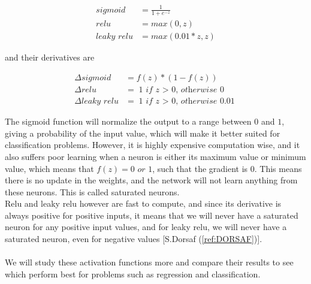 \documentclass[english,notitlepage,reprint,nofootinbib]{revtex4-1}  %
\begin{document}
\begin{align*}
\textit{sigmoid} &= \frac{1}{1 + e^{-z}} \\
\textit{relu} &= max(0,z) \\ 
\textit{leaky relu} &= max(0.01*z, z)
\end{align*}

and their derivatives are

\begin{align*}
\Delta \textit{sigmoid} &= f(z) * (1-f(z)) \\
\Delta \textit{relu} &= \textit{1 if z $>$ 0, otherwise 0} \\ 
\Delta \textit{leaky relu} &= \textit{1 if z $>$ 0, otherwise 0.01}
\end{align*}

The sigmoid function will normalize the output to a range between $0$ and $1$, giving a probability of the input value, which will make it better suited for classification problems. However, it is highly expensive computation wise, and it also suffers poor learning when a neuron is either its maximum value or minimum value, which means that $f(z) = \textit{0 or 1}$, such that the gradient is $0$. This means there is no update in the weights, and the network will not learn anything from these neurons. This is called saturated neurons.
\\
Relu and leaky relu however are fast to compute, and since its derivative is always positive for positive inputs, it means that we will never have a saturated neuron for any positive input values, and for leaky relu, we will never have a saturated neuron, even for negative values [S.Dorsaf (\ref{ref:DORSAF})].
\\
\\
We will study these activation functions more and compare their results to see which perform best for problems such as regression and classification.
\end{document}
